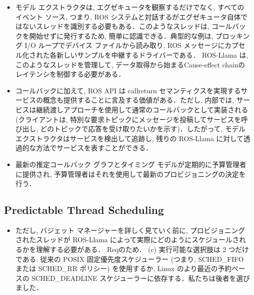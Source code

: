 \begin{frame}{}
    \begin{itemize}
        \item モデル エクストラクタは, エグゼキュータを観察するだけでなく, すべてのイベント ソース, つまり, ROS システムと対話するがエグゼキュータ自体ではないスレッドを識別する必要もある．このようなスレッドは, コールバックを開始せずに発行するため, 簡単に認識できる．典型的な例は, ブロッキング I/O ループでデバイス ファイルから読み取り, ROS メッセージにカプセル化された各新しいサンプルを中継するドライバーである． ROS-Llama は, このようなスレッドを管理して, データ取得から始まるCause-effect chainのレイテンシを制御する必要がある．
    \end{itemize}
\end{frame}

\begin{frame}{}
    \begin{itemize}
        \item コールバックに加えて, ROS API は callreturn セマンティクスを実現するサービスの概念も提供することに言及する価値がある．ただし, 内部では, サービスは継続渡しアプローチを使用して通常のコールバックとして実装される (クライアントは, 特別な要求トピックにメッセージを投稿してサービスを呼び出し, どのトピックで応答を受け取りたいかを示す)．したがって, モデル エクストラクタはサービスを検出して追跡し, 残りの ROS-Llama に対して透過的な方法でサービスを表すことができる．
    \end{itemize}
\end{frame}

\begin{frame}{}
    \begin{itemize}
        \item 最新の推定コールバック グラフとタイミング モデルが定期的に予算管理者に提供され, 予算管理者はそれを使用して最新のプロビジョニングの決定を行う．
    \end{itemize}
\end{frame}


\subsection{Predictable Thread Scheduling}
\label{ssec: predictable thread scheduling}

\begin{frame}{}
    \begin{itemize}
        \item ただし, バジェット マネージャーを詳しく見ていく前に, プロビジョニングされたスレッドが ROS-Llama によって実際にどのようにスケジュールされるかを理解する必要がある． Reqのため． (c) 実行可能な選択肢は 2 つだけである: 従来の POSIX 固定優先度スケジューラー (つまり, SCHED\_FIFO または SCHED\_RR ポリシー) を使用するか, Linux のより最近の予約ベースの SCHED\_DEADLINE スケジューラーに依存する．私たちは後者を選びました．
    \end{itemize}
\end{frame}

